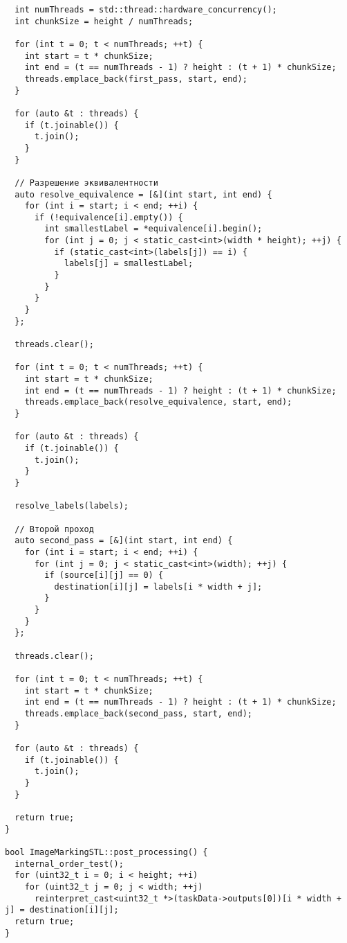 \documentclass[a4paper, 14pt]{article}
\begin{document}
\begin{verbatim}
  int numThreads = std::thread::hardware_concurrency();
  int chunkSize = height / numThreads;

  for (int t = 0; t < numThreads; ++t) {
    int start = t * chunkSize;
    int end = (t == numThreads - 1) ? height : (t + 1) * chunkSize;
    threads.emplace_back(first_pass, start, end);
  }

  for (auto &t : threads) {
    if (t.joinable()) {
      t.join();
    }
  }

  // Разрешение эквивалентности
  auto resolve_equivalence = [&](int start, int end) {
    for (int i = start; i < end; ++i) {
      if (!equivalence[i].empty()) {
        int smallestLabel = *equivalence[i].begin();
        for (int j = 0; j < static_cast<int>(width * height); ++j) {
          if (static_cast<int>(labels[j]) == i) {
            labels[j] = smallestLabel;
          }
        }
      }
    }
  };

  threads.clear();

  for (int t = 0; t < numThreads; ++t) {
    int start = t * chunkSize;
    int end = (t == numThreads - 1) ? height : (t + 1) * chunkSize;
    threads.emplace_back(resolve_equivalence, start, end);
  }

  for (auto &t : threads) {
    if (t.joinable()) {
      t.join();
    }
  }

  resolve_labels(labels);

  // Второй проход
  auto second_pass = [&](int start, int end) {
    for (int i = start; i < end; ++i) {
      for (int j = 0; j < static_cast<int>(width); ++j) {
        if (source[i][j] == 0) {
          destination[i][j] = labels[i * width + j];
        }
      }
    }
  };

  threads.clear();

  for (int t = 0; t < numThreads; ++t) {
    int start = t * chunkSize;
    int end = (t == numThreads - 1) ? height : (t + 1) * chunkSize;
    threads.emplace_back(second_pass, start, end);
  }

  for (auto &t : threads) {
    if (t.joinable()) {
      t.join();
    }
  }

  return true;
}

bool ImageMarkingSTL::post_processing() {
  internal_order_test();
  for (uint32_t i = 0; i < height; ++i)
    for (uint32_t j = 0; j < width; ++j)
      reinterpret_cast<uint32_t *>(taskData->outputs[0])[i * width + j] = destination[i][j];
  return true;
}

	\end{verbatim}
\end{document}

